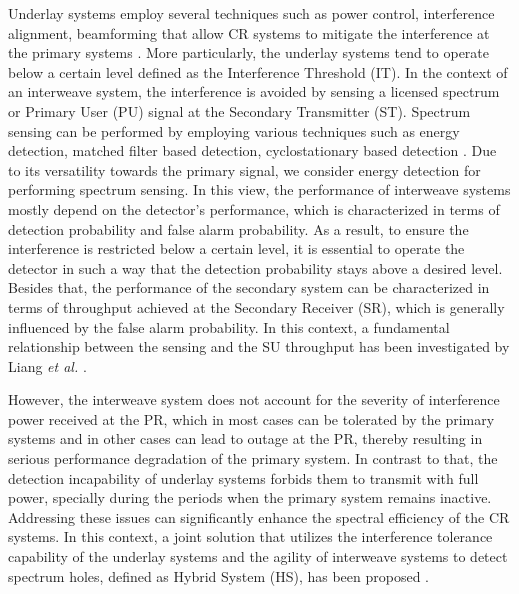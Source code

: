 Underlay systems employ several techniques such as power control, interference alignment, beamforming that allow CR systems to mitigate the interference at the primary systems \cite{Sharma15}. More particularly, the underlay systems tend to operate below a certain level defined as the Interference Threshold (IT). 
In the context of an interweave system, the interference is avoided by sensing a licensed spectrum or Primary User (PU) signal at the Secondary Transmitter (ST).
Spectrum sensing can be performed by employing various techniques such as energy detection, matched filter based detection, cyclostationary based detection \cite{Sharma15}. Due to its versatility towards the primary signal, we consider energy detection for performing spectrum sensing. In this view, the performance of interweave systems mostly depend on the detector's performance, which is characterized in terms of detection probability and false alarm probability. 
As a result, to ensure the interference is restricted below a certain level, it is essential to operate the detector in such a way that the detection probability stays above a desired level. Besides that, the performance of the secondary system can be characterized in terms of throughput achieved at the Secondary Receiver (SR), which is generally influenced by the false alarm probability. In this context, a fundamental relationship between the sensing and the SU throughput has been investigated by Liang \textit{et al.} \cite{Liang08}. 

However, the interweave system does not account for the severity of interference power received at the PR, which in most cases can be tolerated by the primary systems and in other cases can lead to outage at the PR, thereby resulting in serious performance degradation of the primary system. In contrast to that, the detection incapability of underlay systems forbids them to transmit with full power, specially during the periods when the primary system remains inactive. Addressing these issues can significantly enhance the spectral efficiency of the CR systems. In this context, a joint solution that utilizes the interference tolerance capability of the underlay systems and the agility of interweave systems to detect spectrum holes, defined as Hybrid System (HS), has been proposed \cite{Kang09, Oh10, Senthu12, Jiang13, Sharma14}. 


